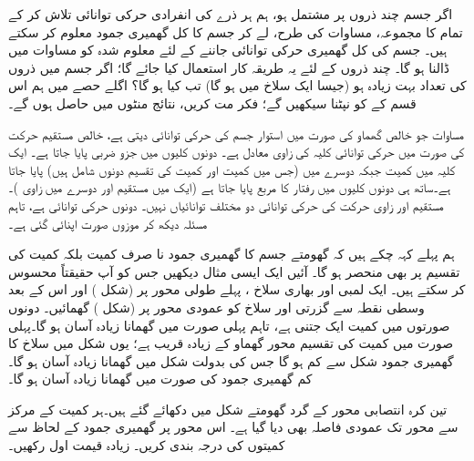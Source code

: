 اگر جسم چند ذروں پر مشتمل  ہو، ہم ہر ذرے کی انفرادی حرکی توانائی    تلاش کر کے تمام کا مجموعہ، مساوات   کی طرح، لے کر جسم کا  کل گھمیری جمود  معلوم کر سکتے ہیں۔ جسم کی کل گھمیری حرکی توانائی جاننے  کے لئے    معلوم شدہ  کو   مساوات  میں ڈالنا ہو گا۔ چند ذروں کے لئے یہ  طریقہ کار استعمال کیا جائے گا؛   اگر جسم  میں ذروں کی تعداد بہت زیادہ  ہو (جیسا ایک سلاخ میں ہو گا) تب  کیا ہو گا؟ اگلے حصے میں ہم  اس  قسم کے  کو نپٹنا سیکھیں گے؛ فکر  مت کریں، نتائج منٹوں میں حاصل ہوں گے۔

مساوات  جو  خالص گھماو کی صورت میں استوار جسم کی حرکی توانائی  دیتی ہے،  خالص مستقیم حرکت کی صورت میں حرکی توانائی  کلیہ  کی  زاوی  معادل  ہے۔ دونوں کلیوں میں  جزو ضربی پایا جاتا ہے۔ ایک کلیہ میں کمیت   جبکہ دوسرے میں  (جس میں کمیت اور  کمیت  کی تقسیم  دونوں شامل ہیں)  پایا جاتا ہے۔ساتھ ہی دونوں کلیوں میں رفتار کا مربع پایا جاتا ہے (ایک میں مستقیم اور دوسرے میں زاوی )۔ مستقیم اور زاوی حرکت کی حرکی توانائی دو مختلف توانائیاں نہیں۔ دونوں حرکی توانائی ہے، تاہم مسئلہ دیکھ کر موزوں صورت اپنائی   گئی ہے۔

ہم پہلے کہہ چکے ہیں  کہ گھومتے  جسم کا گھمیری جمود نا صرف کمیت بلکہ کمیت کی تقسیم پر بھی منحصر ہو گا۔ آئیں ایک ایسی مثال دیکھیں جس کو آپ حقیقتاً محسوس کر  سکتے ہیں۔ ایک   لمبی   اور بھاری  سلاخ ، پہلے   طولی  محور پر (شکل )    اور اس کے  بعد  وسطی نقطہ سے گزرتی    اور سلاخ کو عمودی   محور  پر  (شکل ) گھمائیں۔  دونوں صورتوں  میں کمیت  ایک جتنی ہے، تاہم  پہلی صورت میں گھمانا زیادہ  آسان ہو گا۔پہلی صورت میں  کمیت  کی تقسیم محور گھماو کے  زیادہ قریب ہے؛ یوں شکل  میں سلاخ کا گھمیری جمود شکل  سے کم ہو گا جس کی بدولت شکل  میں گھمانا زیادہ آسان ہو گا۔ کم گھمیری جمود  کی صورت میں گھمانا زیادہ آسان ہو گا۔

تین کرہ انتصابی محور کے گرد گھومتے شکل میں دکھائے گئے ہیں۔ہر کمیت کے مرکز سے محور تک عمودی  فاصلہ بھی دیا گیا ہے۔ اس محور پر گھمیری جمود کے لحاظ سے کمیتوں کی درجہ بندی کریں۔ زیادہ قیمت اول رکھیں۔
\begin{center}
\end{center}
